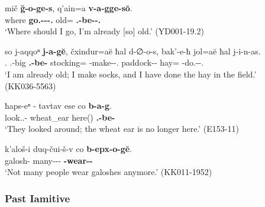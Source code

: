 \begin{exe}
	\ex\label{verbflex-ex18}
	\begin{xlist}
		
		\ex\label{verbflex-ex18a}
		\gll mič \textbf{\u{g}-o-ge-s}, q'ain=a \textbf{v-a-gge-s\u{o}}. \\
		where \textbf{go.{\Pfv}-{\Npst}-{\Iam}-{\Fsg}.{\Erg}} old={\Emph} \textbf{{\M}.{\Sg}-be-{\Iam}-{\Fsg}.{\Nom}} \\
		\trans `Where should I go, I'm already [so] old.'
		\hfill (YD001-19.2)
		
		\ex\label{verbflex-ex18b}
		\gll so j-aqqoⁿ \textbf{j-a-g\u{e}}, čxindur=a\u{e} ħal d-∅-o-s, bak'-e-ħ jol=a\u{e} ħal j-i-n-as. \\
		{\Fsg}.{\Nom} {\F}.{\Sg}-big \textbf{{\F}.{\Sg}-be-{\Iam}} stocking={\Add} {\Pv} {\D}-make-{\Npst}-{\Fsg}.{\Erg} paddock-{\Obl}-{\Ess} hay={\Add} {\Pv} {\J}-do.{\Pfv}-{\Aor}-{\Fsg}.{\Erg} \\
		\trans `I am already old; I make socks, and I have done the hay in the field.' \\
		\hfill (KK036-5563)
		
	\end{xlist}
\end{exe}

\begin{exe}
	\ex\label{verbflex-ex19}
	\begin{xlist}
		
		\ex\label{verbflex-ex19a}
		\gll ħaps-eⁿ - tavtav ese co \textbf{b-a-g}. \\
		look.{\Pl}.{\Pfv}-{\Aor} {} wheat\_ear here({\Ess}) {\Neg} \textbf{{\B}.{\Sg}-be-{\Iam}} \\
		\trans `They looked around; the wheat ear is no longer here.'
		\hfill (E153-11)
		
		\ex\label{verbflex-ex19b}
		\gll k'aloš-i duq-čui-š-v co \textbf{b-epx-o-g\u{e}}. \\
		galosh-{\Pl} many-{\Obl}-{\Pl}-{\Erg} {\Neg} \textbf{{\B}-wear-{\Npst}-{\Iam}} \\
		\trans `Not many people wear galoshes anymore.'
		\hfill (KK011-1952)
		
	\end{xlist}
\end{exe}


\subsubsection{Past Iamitive}

